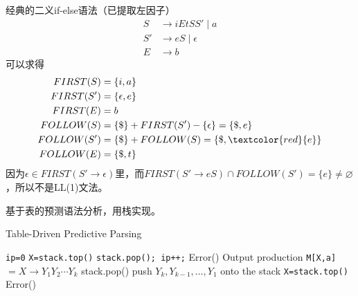 \begin{example}
经典的二义if-else语法（已提取左因子）
\[\begin{aligned}
S &\to iEtSS'\mid a\\
S' &\to eS\mid\epsilon\\
E &\to b
\end{aligned}\]
可以求得
\[\begin{aligned}
FIRST(S) &= \{i,a\}\\
FIRST(S') &= \{\epsilon,e\}\\
FIRST(E) &= b\\
FOLLOW(S) &= \{\$\} + FIRST(S')-\{\epsilon\}=\{\$,e\}\\
FOLLOW(S') &= \{\$\} + FOLLOW(S) = \{\$,\textcolor{red}{e}\}\\
FOLLOW(E) &= \{\$,t\}
\end{aligned}\]
因为$\epsilon\in FIRST(S'\to\epsilon)$里，而$FIRST(S'\to eS)\cap FOLLOW(S')=\{e\}\ne\varnothing$，所以不是LL(1)文法。
\end{example}

基于表的预测语法分析，用栈实现。
\begin{algorithm}
\caption{Table-Driven Predictive Parsing}
\begin{algorithmic}[1]
\State \verb'ip=0'
\State \verb'X=stack.top()'
\State \verb'stack.pop(); ip++;'
\Else {}
\State Error()
\Else
\State Output production \verb'M[X,a]'$=X\to Y_1Y_2\cdots Y_k$
\State stack.pop()
\State push $Y_k,Y_{k-1},\ldots,Y_1$ onto the stack
\EndIf
\EndIf
\State \verb'X=stack.top()'
\EndWhile
{}
\State Error()
\EndIf
\end{algorithmic}
\end{algorithm}

